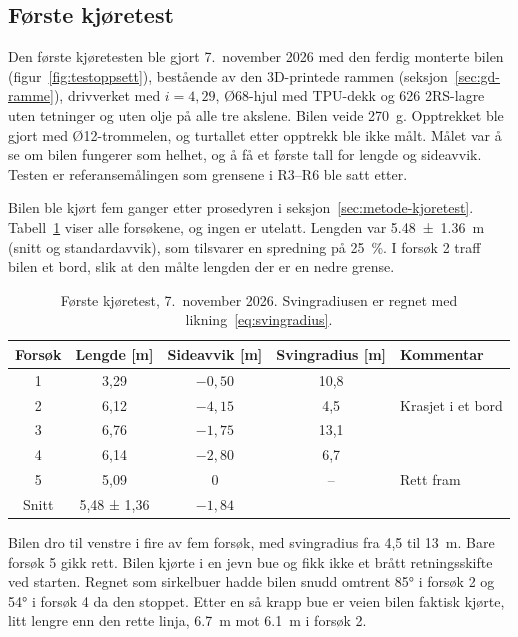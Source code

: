 \subsection{Første kjøretest}
\label{sec:res-kjoretest}
Den første kjøretesten ble gjort 7.~november 2026 med den ferdig monterte bilen (figur~\ref{fig:testoppsett}), bestående av den 3D-printede rammen (seksjon~\ref{sec:gd-ramme}), drivverket med $i = 4{,}29$, Ø68-hjul med TPU-dekk og 626 2RS-lagre uten tetninger og uten olje på alle tre akslene. Bilen veide \SI{270}{g}. Opptrekket ble gjort med Ø12-trommelen, og turtallet etter opptrekk ble ikke målt. Målet var å se om bilen fungerer som helhet, og å få et første tall for lengde og sideavvik. Testen er referansemålingen som grensene i R3--R6 ble satt etter.

Bilen ble kjørt fem ganger etter prosedyren i seksjon~\ref{sec:metode-kjoretest}. Tabell~\ref{tab:kjoretest1} viser alle forsøkene, og ingen er utelatt. Lengden var \SI[separate-uncertainty=true]{5,48 \pm 1,36}{m} (snitt og standardavvik), som tilsvarer en spredning på \SI{25}{\percent}. I forsøk 2 traff bilen et bord, slik at den målte lengden der er en nedre grense.

\begin{table}[H]
    \centering
    \caption[Første kjøretest]{Første kjøretest, 7.~november 2026. Svingradiusen er regnet med likning~\eqref{eq:svingradius}.}
    \label{tab:kjoretest1}
    \small
    \renewcommand{\arraystretch}{1.3}
    \begin{tabular}{|c|c|c|c|l|}
        \hline
        \textbf{Forsøk} & \textbf{Lengde [m]} & \textbf{Sideavvik [m]} & \textbf{Svingradius [m]} & \textbf{Kommentar} \\
        \hline
        1 & 3,29 & $-0{,}50$ & 10,8 & \\
        2 & 6,12 & $-4{,}15$ & 4,5 & Krasjet i et bord \\
        3 & 6,76 & $-1{,}75$ & 13,1 & \\
        4 & 6,14 & $-2{,}80$ & 6,7 & \\
        5 & 5,09 & 0 & -- & Rett fram \\
        \hline
        Snitt & 5,48 ± 1,36 & $-1{,}84$ & & \\
        \hline
    \end{tabular}
\end{table}

Bilen dro til venstre i fire av fem forsøk, med svingradius fra 4,5 til \SI{13}{m}. Bare forsøk 5 gikk rett. Bilen kjørte i en jevn bue og fikk ikke et brått retningsskifte ved starten. Regnet som sirkelbuer hadde bilen snudd omtrent 85° i forsøk 2 og 54° i forsøk 4 da den stoppet. Etter en så krapp bue er veien bilen faktisk kjørte, litt lengre enn den rette linja, \SI{6,7}{m} mot \SI{6,1}{m} i forsøk 2.


